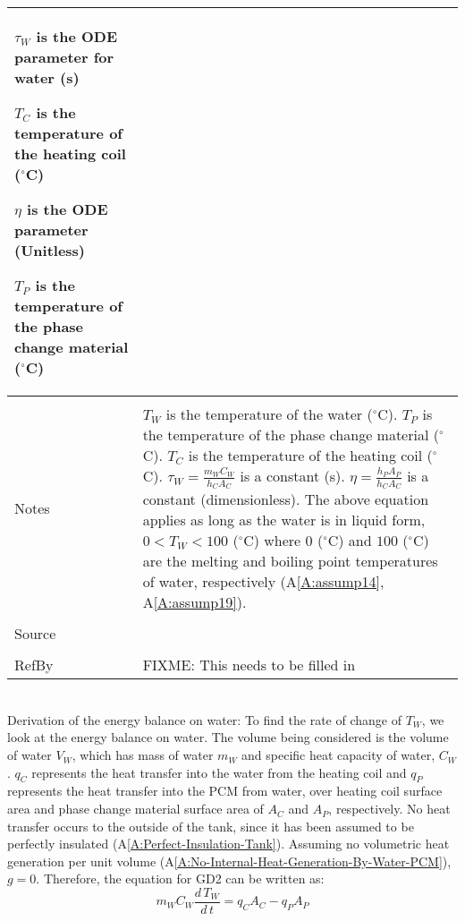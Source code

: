 \documentclass[12pt]{article}
\begin{document}
\begin{minipage}{\textwidth}
\begin{tabular}{p{} p{}}
\begin{symbDescription}
              \item{${τ_{W}}$ is the ODE parameter for water (s)}
              \item{${T_{C}}$ is the temperature of the heating coil (${}^{\circ}$C)}
              \item{$η$ is the ODE parameter (Unitless)}
              \item{${T_{P}}$ is the temperature of the phase change material (${}^{\circ}$C)}
              \end{symbDescription}
\\ \midrule \\
Notes & ${T_{W}}$ is the temperature of the water (${}^{\circ}$C). ${T_{P}}$ is the temperature of the phase change material (${}^{\circ}$C). ${T_{C}}$ is the temperature of the heating coil (${}^{\circ}$C). ${τ_{W}}=\frac{{m_{W}} {C_{W}}}{{h_{C}} {A_{C}}}$ is a constant (s). $η=\frac{{h_{P}} {A_{P}}}{{h_{C}} {A_{C}}}$ is a constant (dimensionless). The above equation applies as long as the water is in liquid form, $0<{T_{W}}<100$ (${}^{\circ}$C) where $0$ (${}^{\circ}$C) and $100$ (${}^{\circ}$C) are the melting and boiling point temperatures of water, respectively (A\ref{A:assump14}, A\ref{A:assump19}).
\\ \midrule \\
Source & 
\\ \midrule \\
RefBy & FIXME: This needs to be filled in
\\ \bottomrule \end{tabular}
\end{minipage}\\
Derivation of the energy balance on water:
To find the rate of change of ${T_{W}}$, we look at the energy balance on water. The volume being considered is the volume of water ${V_{W}}$, which has mass of water ${m_{W}}$ and specific heat capacity of water, ${C_{W}}$. ${q_{C}}$ represents the heat transfer into the water from the heating coil and ${q_{P}}$ represents the heat transfer into the PCM from water, over heating coil surface area and phase change material surface area of ${A_{C}}$ and ${A_{P}}$, respectively. No heat transfer occurs to the outside of the tank, since it has been assumed to be perfectly insulated (A\ref{A:Perfect-Insulation-Tank}). Assuming no volumetric heat generation per unit volume (A\ref{A:No-Internal-Heat-Generation-By-Water-PCM}), $g=0$. Therefore, the equation for GD2 can be written as:
\begin{dmath}
{m_{W}} {C_{W}} \frac{d\,{T_{W}}}{d\,t}={q_{C}} {A_{C}}-{q_{P}} {A_{P}}
\end{dmath}
\end{document}
